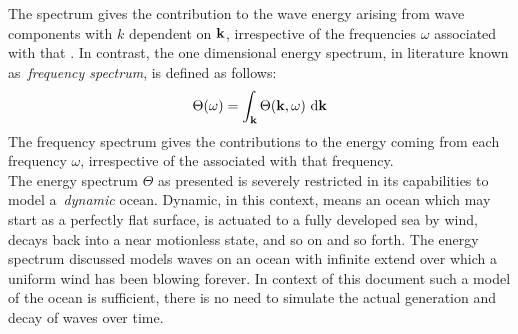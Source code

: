 The \wavenumber spectrum gives the contribution to the wave energy arising from
wave components with \wavenumber $k$ dependent on \wavevector $\mathbf{k}$,
irrespective of the frequencies $\omega$ associated with that \wavenumber. In
contrast, the one dimensional energy spectrum, in literature known
as~\emph{frequency spectrum}, is defined as follows:
\begin{equation}
\label{eq:energy_spectrum_1d}
 \Theta(\omega) = \int_{\mathbf{k}} \Theta(\mathbf{k}, \omega)~\mathrm{d}\mathbf{k}
\end{equation}
The frequency spectrum gives the contributions to the energy coming from each
frequency $\omega$, irrespective of the \wavenumbers associated with that
frequency.\\

The energy spectrum $\Theta$ as presented is severely restricted in its
capabilities to model a~\emph{dynamic} ocean. Dynamic, in this context, means an
ocean which may start as a perfectly flat surface, is actuated to a fully
developed sea by wind, decays back into a near motionless state, and so on and
so forth. The energy spectrum discussed models waves on an ocean with infinite
extend over which a uniform wind has been blowing forever. In context of this
document such a model of the ocean is sufficient, there is no need to simulate
the actual generation and decay of waves over time.

